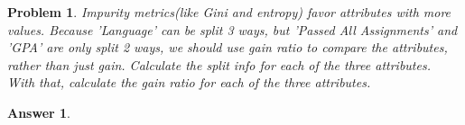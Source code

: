 \documentclass[11pt]{article}
\theoremstyle{description}
\newtheorem{problem}{Problem}
\theoremstyle{break}
\newtheorem*{answer}{Answer}
\begin{document}
    \begin{problem}
        Impurity metrics(like Gini and entropy) favor attributes with more values.
        Because 'Language' can be split 3 ways, but 'Passed All Assignments' and 'GPA' are only
        split 2 ways, we should use gain ratio to compare the attributes, rather than just gain.
        Calculate the split info for each of the three attributes.
        With that, calculate the gain ratio for each of the three attributes.
    \end{problem}
    \begin{answer}
    \end{answer}
\end{document}
